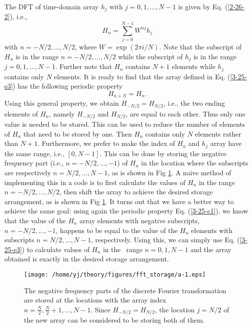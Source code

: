 \documentclass{article}
\begin{document}
The DFT of time-domain array $h_j$ with $j = 0, 1, \ldots, N - 1$ is given by
Eq. (\ref{2-26-2}), i.e.,
\begin{equation}
  \label{3-25-e3} H_n = \sum_{j = 0}^{N - 1} W^{n j} h_j
\end{equation}
with $n = - N / 2, \ldots, N / 2$, where $W = \exp (2 \pi i / N)$. Note that
the subscript of $H_n$ is in the range $n = - N / 2, \ldots, N / 2$ while the
subscript of $h_j$ is in the range $j = 0, 1, \ldots, N - 1$. Further note
that $H_n$ contains $N + 1$ elements while $h_j$ contains only $N$ elements.
It is ready to find that the array defined in Eq. (\ref{3-25-e3}) has the
following periodic property
\begin{equation}
  \label{3-25-e1} H_{n + N} = H_n .
\end{equation}
Using this general property, we obtain $H_{- N / 2} = H_{N / 2}$, i.e., the
two ending elements of $H_n$, namely $H_{- N / 2}$ and $H_{N / 2}$, are equal
to each other. Thus only one value is needed to be stored. This can be used to
reduce the number of elements of $H_n$ that need to be stored by one. Then
$H_n$ contains only $N$ elements rather than $N + 1$. Furthermore, we prefer
to make the index of $H_n$ and $h_j$ array have the same range, i.e., $[0, N -
1]$. This can be done by storing the negative frequency part (i.e., $n = - N /
2, \ldots, - 1$) of $H_n$ in the location where the subscripts are
respectively $n = N / 2, \ldots, N - 1$, as is shown in Fig \ref{4-16-1}. A
naive method of implementing this in a code is to first calculate the values
of $H_n$ in the range $n = - N / 2, \ldots, N / 2$, then shift the array to
achieve the desired storage arrangement, as is shown in Fig \ref{4-16-1}. It
turns out that we have a better way to achieve the same goal: using again the
periodic property Eq. (\ref{3-25-e1}), we know that the value of the $H_n$
array elements with negative subscripts, $n = - N / 2, \ldots, - 1$, happens
to be equal to the value of the $H_n$ elements with subscripts $n = N / 2,
\ldots, N - 1$, respectively. Using this, we can simply use Eq.
(\ref{3-25-e3}) to calculate values of $H_n$ in the \ range $n = 0, 1, N - 1$
and the array obtained is exactly in the desired storage arrangement.

\begin{figure}[h]
  \texttt{[image: /home/yj/theory/figures/fft\_storage/a-1.eps]}
  \caption{\label{4-16-1}The negative frequency parts of the discrete Fourier
  transformation are stored at the locations with the array index $n =
  \frac{N}{2}, \frac{N}{2} + 1, \ldots, N - 1$. Since $H_{- N / 2} = H_{N /
  2}$, the location $j = N / 2$ of the new array can be considered to be
  storing both of them.}
\end{figure}
\end{document}
